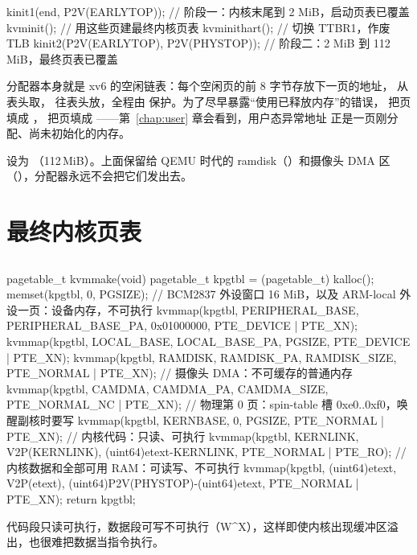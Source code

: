 \begin{ccode}
kinit1(end, P2V(EARLYTOP));          // 阶段一：内核末尾到 2 MiB，启动页表已覆盖
kvminit();                           // 用这些页建最终内核页表
kvminithart();                       // 切换 TTBR1，作废 TLB
kinit2(P2V(EARLYTOP), P2V(PHYSTOP)); // 阶段二：2 MiB 到 112 MiB，最终页表已覆盖
\end{ccode}

分配器本身就是 xv6 的空闲链表：每个空闲页的前 8 字节存放下一页的地址， 从表头取， 往表头放，全程由  保护。为了尽早暴露“使用已释放内存”的错误， 把页填成 ， 把页填成 ——第~\ref{chap:user} 章会看到，用户态异常地址  正是一页刚分配、尚未初始化的内存。

 设为 （112\,MiB）。上面保留给 QEMU 时代的 ramdisk（）和摄像头 DMA 区（），分配器永远不会把它们发出去。

\section{最终内核页表}

\subsection{}

\begin{ccode}
pagetable_t kvmmake(void) {
  pagetable_t kpgtbl = (pagetable_t) kalloc();
  memset(kpgtbl, 0, PGSIZE);
  // BCM2837 外设窗口 16 MiB，以及 ARM-local 外设一页：设备内存，不可执行
  kvmmap(kpgtbl, PERIPHERAL_BASE, PERIPHERAL_BASE_PA, 0x01000000, PTE_DEVICE | PTE_XN);
  kvmmap(kpgtbl, LOCAL_BASE, LOCAL_BASE_PA, PGSIZE, PTE_DEVICE | PTE_XN);
  kvmmap(kpgtbl, RAMDISK, RAMDISK_PA, RAMDISK_SIZE, PTE_NORMAL | PTE_XN);
  // 摄像头 DMA：不可缓存的普通内存
  kvmmap(kpgtbl, CAMDMA, CAMDMA_PA, CAMDMA_SIZE, PTE_NORMAL_NC | PTE_XN);
  // 物理第 0 页：spin-table 槽 0xe0..0xf0，唤醒副核时要写
  kvmmap(kpgtbl, KERNBASE, 0, PGSIZE, PTE_NORMAL | PTE_XN);
  // 内核代码：只读、可执行
  kvmmap(kpgtbl, KERNLINK, V2P(KERNLINK), (uint64)etext-KERNLINK, PTE_NORMAL | PTE_RO);
  // 内核数据和全部可用 RAM：可读写、不可执行
  kvmmap(kpgtbl, (uint64)etext, V2P(etext), (uint64)P2V(PHYSTOP)-(uint64)etext,
         PTE_NORMAL | PTE_XN);
  return kpgtbl;
}
\end{ccode}

代码段只读可执行，数据段可写不可执行（W\^{}X），这样即使内核出现缓冲区溢出，也很难把数据当指令执行。

